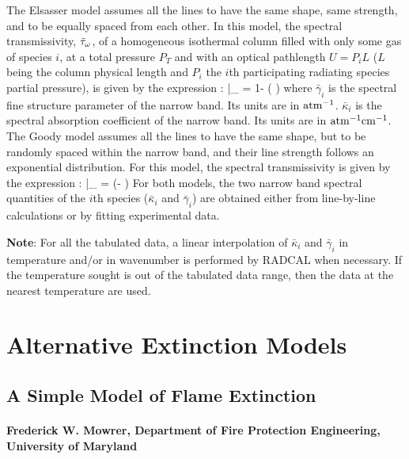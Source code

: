 The Elsasser model assumes all the lines to have the same shape, same strength,
and to be equally spaced from each other. In this model, the spectral
transmissivity, $\bar{\tau}_{\omega}$, of a homogeneous isothermal column filled
with only some gas of species $i$,
at a total pressure $P_T$ and with an optical pathlength $U = P_i L$ ($L$
being the column physical length and $P_i$ the $i$th participating radiating
species partial pressure), is given by the expression \cite{Modest:2003}:
\be\label{eq::Elsasser}
    \bar{\tau}_{\om} = 1- \erf \left(   \right)
\ee
where $\bar{\gamma}_i$ is the spectral fine structure parameter of the narrow
band. Its units are in $\rm atm^{-1}$. $\bar{\kappa}_i$ is the spectral absorption coefficient of the narrow
band. Its units are in $\rm atm^{-1}cm^{-1}$. The Goody model assumes all the lines to have the same shape, but to be randomly
spaced within the narrow band, and their line strength follows an exponential
distribution. For this model, the spectral transmissivity is given by the expression \cite{Modest:2003}:
\be\label{eq::Goody}
    \bar{\tau}_{\om} = \exp\left(- {\displaystyle {}}\right)
\ee
For both models, the two narrow band spectral quantities of the $i$th species ($\bar{\kappa}_i$ and
$\bar{\gamma}_i$) are obtained either from line-by-line calculations or by fitting
experimental data.

\textbf{Note}: For all the tabulated data, a linear interpolation of
$\bar{\kappa}_i$ and $\bar{\gamma}_i$ in temperature and/or in wavenumber is
performed by RADCAL when necessary. If the temperature sought is out of the
tabulated data range, then the data at the nearest temperature are used.

\chapter{Alternative Extinction Models}
\label{alternative_extinction_models}

\section{A Simple Model of Flame Extinction}
\label{o2_based_model}

\subsubsection*{Frederick W. Mowrer, Department of Fire Protection Engineering, University of Maryland}


